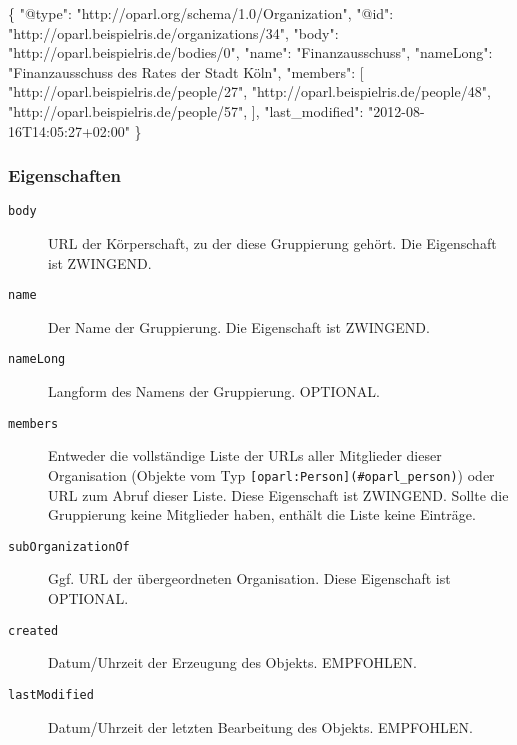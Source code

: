 \documentclass[,a4paper]{article}
\newenvironment{Shaded}{}{}
\newcommand{\DataTypeTok}[1]{\textcolor[rgb]{0.56,0.13,0.00}{{#1}}}
\newcommand{\StringTok}[1]{\textcolor[rgb]{0.25,0.44,0.63}{{#1}}}
\newcommand{\NormalTok}[1]{{#1}}
\begin{document}
\begin{Shaded}
\begin{Highlighting}[]
\NormalTok{\{}
    \DataTypeTok{"@type"}\NormalTok{: }\StringTok{"http://oparl.org/schema/1.0/Organization"}\NormalTok{,}
    \DataTypeTok{"@id"}\NormalTok{: }\StringTok{"http://oparl.beispielris.de/organizations/34"}\NormalTok{,}
    \DataTypeTok{"body"}\NormalTok{: }\StringTok{"http://oparl.beispielris.de/bodies/0"}\NormalTok{,}
    \DataTypeTok{"name"}\NormalTok{: }\StringTok{"Finanzausschuss"}\NormalTok{,}
    \DataTypeTok{"nameLong"}\NormalTok{: }\StringTok{"Finanzausschuss des Rates der Stadt Köln"}\NormalTok{,}
    \DataTypeTok{"members"}\NormalTok{: [}
        \StringTok{"http://oparl.beispielris.de/people/27"}\NormalTok{,}
        \StringTok{"http://oparl.beispielris.de/people/48"}\NormalTok{,}
        \StringTok{"http://oparl.beispielris.de/people/57"}\NormalTok{,}
    \NormalTok{],}
    \DataTypeTok{"last_modified"}\NormalTok{: }\StringTok{"2012-08-16T14:05:27+02:00"}
\NormalTok{\}}
\end{Highlighting}
\end{Shaded}

\subsubsection{Eigenschaften}\label{eigenschaften-2}

\begin{description}
\item[\texttt{body}]
URL der Körperschaft, zu der diese Gruppierung gehört. Die Eigenschaft
ist ZWINGEND.
\item[\texttt{name}]
Der Name der Gruppierung. Die Eigenschaft ist ZWINGEND.
\item[\texttt{nameLong}]
Langform des Namens der Gruppierung. OPTIONAL.
\item[\texttt{members}]
Entweder die vollständige Liste der URLs aller Mitglieder dieser
Organisation (Objekte vom Typ
\texttt{{[}oparl:Person{]}(\#oparl\_person)}) oder URL zum Abruf dieser
Liste. Diese Eigenschaft ist ZWINGEND. Sollte die Gruppierung keine
Mitglieder haben, enthält die Liste keine Einträge.
\item[\texttt{subOrganizationOf}]
Ggf. URL der übergeordneten Organisation. Diese Eigenschaft ist
OPTIONAL.
\item[\texttt{created}]
Datum/Uhrzeit der Erzeugung des Objekts. EMPFOHLEN.
\item[\texttt{lastModified}]
Datum/Uhrzeit der letzten Bearbeitung des Objekts. EMPFOHLEN.
\end{description}
\end{document}
